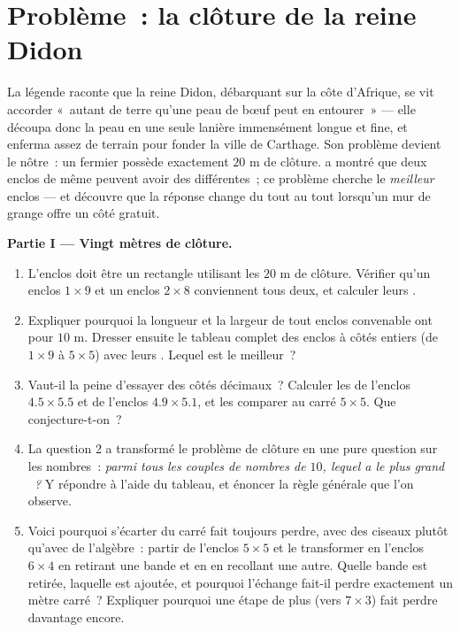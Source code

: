 \section{Problème~: la clôture de la reine Didon}

\begin{problem}
\label{pb:g6:measure:1}
La légende raconte que la reine Didon, débarquant sur la côte
d'Afrique, se vit accorder «~autant de terre qu'une peau de bœuf peut
en entourer~» --- elle découpa donc la peau en une seule lanière
immensément longue et fine, et enferma assez de terrain pour fonder
la ville de Carthage. Son problème devient le nôtre~: un fermier
possède exactement $20$ m de clôture.  a
montré que deux enclos de même  peuvent avoir des 
différentes~; ce problème cherche le \emph{meilleur} enclos --- et
découvre que la réponse change du tout au tout lorsqu'un mur de
grange offre un côté gratuit.

\medskip
\noindent\textbf{Partie I --- Vingt mètres de clôture.}
\begin{enumerate}
  \item L'enclos doit être un rectangle utilisant les $20$ m de
        clôture. Vérifier qu'un enclos $1 \times 9$ et un enclos
        $2 \times 8$ conviennent tous deux, et calculer leurs .
  \item Expliquer pourquoi la longueur et la largeur de tout enclos
        convenable ont pour  $10$ m. Dresser ensuite le tableau
        complet des enclos à côtés entiers (de $1 \times 9$ à
        $5 \times 5$) avec leurs . Lequel est le meilleur~?
  \item Vaut-il la peine d'essayer des côtés décimaux~? Calculer les
         de l'enclos $4.5 \times 5.5$ et de l'enclos
        $4.9 \times 5.1$, et les comparer au carré $5 \times 5$. Que
        conjecture-t-on~?
  \item La question 2 a transformé le problème de clôture en une
        pure question sur les nombres~: \emph{parmi tous les couples
        de nombres de  $10$, lequel a le plus grand ~?}
        Y répondre à l'aide du tableau, et énoncer la règle générale
        que l'on observe.
  \item Voici pourquoi s'écarter du carré fait toujours perdre, avec
        des ciseaux plutôt qu'avec de l'algèbre~: partir de l'enclos
        $5 \times 5$ et le transformer en l'enclos $6 \times 4$ en
        retirant une bande et en en recollant une autre. Quelle
        bande est retirée, laquelle est ajoutée, et pourquoi
        l'échange fait-il perdre exactement un mètre carré~?
        Expliquer pourquoi une étape de plus (vers $7 \times 3$)
        fait perdre davantage encore.
\end{enumerate}


\end{problem}
